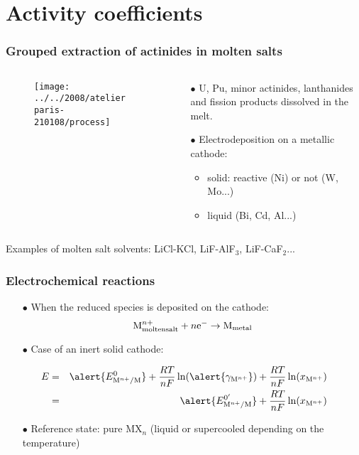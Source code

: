 \documentclass{beamer}
\begin{document}
\section{Activity coefficients}
\begin{frame}
   \frametitle{Grouped extraction of actinides in molten salts}
   \begin{columns}
      \begin{column}{6cm}
         \begin{figure}
            \texttt{[image: ../../2008/atelierparis-210108/process]}
         \end{figure}
      \end{column}
      \begin{column}{6cm}
         \begin{itemize}
            \item[$\bullet$] U, Pu, minor actinides, lanthanides and fission products dissolved in the melt.
            \item[$\bullet$] Electrodeposition on a metallic cathode:
            \begin{itemize}
               \item solid: reactive (Ni) or not (W, Mo...)
               \item liquid (Bi, Cd, Al...)
            \end{itemize}
         \end{itemize}
      \end{column}
   \end{columns}
\vspace{1cm}
Examples of molten salt solvents: LiCl-KCl, LiF-AlF$_3$, LiF-CaF$_2$...
\end{frame}

\begin{frame}
   \frametitle{Electrochemical reactions}
   \begin{itemize}
      \item[$\bullet$] When the reduced species is deposited on the cathode:
          \begin{equation}
             {\rm M}_{\rm molten salt}^{n+}+n{\rm e}^- \rightarrow {\rm M}_{\rm metal} \nonumber
          \end{equation}
      \item[$\bullet$] Case of an inert solid cathode:
   \end{itemize}
             \begin{eqnarray}
                E&=&\alert{E^0_{{\rm M}^{n+}/{\rm M}}}+\frac{RT}{nF}\ln(\alert{\gamma_{{\rm M}^{n+}}})+\frac{RT}{nF}\ln(x_{{\rm M}^{n+}})\nonumber \\
&=&\alert{E^{0'}_{{\rm M}^{n+}/{\rm M}}}+\frac{RT}{nF}\ln(x_{{\rm M}^{n+}}) \nonumber
             \end{eqnarray}
   \begin{itemize}
      \item[$\bullet$] Reference state: pure MX$_n$ (liquid or supercooled depending on the temperature)
   \end{itemize}
\end{frame}
\end{document}
